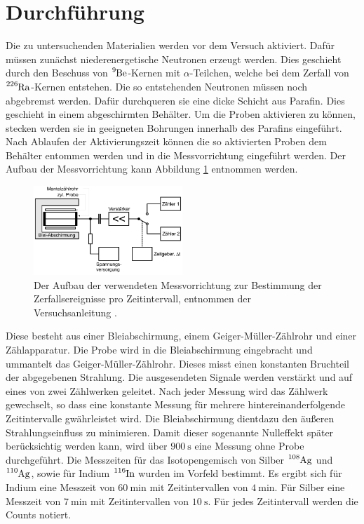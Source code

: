 \section{Durchführung}
\label{sec:Durchführung}

Die zu untersuchenden Materialien werden vor dem Versuch aktiviert.
Dafür müssen zunächst niederenergetische Neutronen erzeugt werden.
Dies geschieht durch den Beschuss von $\ce{^{9}Be}$-Kernen mit $\alpha$-Teilchen, welche bei dem Zerfall von $\ce{^{226}Ra}$-Kernen entstehen.
Die so entstehenden Neutronen müssen noch abgebremst werden.
Dafür durchqueren sie eine dicke Schicht aus Parafin.
Dies geschieht in einem abgeschirmten Behälter.
Um die Proben aktivieren zu können, stecken werden sie in geeigneten Bohrungen innerhalb des Parafins eingeführt.
Nach Ablaufen der Aktivierungszeit können die so aktivierten Proben dem Behälter entommen werden und in die Messvorrichtung eingeführt werden.
Der Aufbau der Messvorrichtung kann Abbildung \ref{fig:Aufbau} entnommen werden.
\FloatBarrier
\begin{figure}
  \centering
  \includegraphics[width=0.5\textwidth]{images/Aufbau.png}
  \caption{Der Aufbau der verwendeten Messvorrichtung zur Bestimmung der Zerfallsereignisse pro Zeitintervall, entnommen der Versuchsanleitung \cite[8]{sample}.}
  \label{fig:Aufbau}
\end{figure}
\FloatBarrier
Diese besteht aus einer Bleiabschirmung, einem Geiger-Müller-Zählrohr und einer Zählapparatur.
Die Probe wird in die Bleiabschirmung eingebracht und ummantelt das Geiger-Müller-Zählrohr.
Dieses misst einen konstanten Bruchteil der abgegebenen Strahlung.
Die ausgesendeten Signale werden verstärkt und auf eines von zwei Zählwerken geleitet.
Nach jeder Messung wird das Zählwerk gewechselt, so dass eine konstante Messung für mehrere hintereinanderfolgende Zeitintervalle gwährleistet wird.
Die Bleiabschirmung dientdazu den äußeren Strahlungseinfluss zu minimieren.
Damit dieser sogenannte Nulleffekt später berücksichtig werden kann, wird über $\SI{900}{\second}$ eine Messung ohne Probe durchgeführt.
Die Messzeiten für das Isotopengemisch von Silber $\ce{^{108}Ag}$ und $\ce{^{110}Ag}$, sowie für Indium $\ce{^{116}In}$ wurden im Vorfeld bestimmt.
Es ergibt sich für Indium eine Messzeit von $\SI{60}{\minute}$ mit Zeitintervallen von $\SI{4}{\minute}$.
Für Silber eine Messzeit von $\SI{7}{\minute}$ mit Zeitintervallen von $\SI{10}{\second}$.
Für jedes Zeitintervall werden die Counts notiert.

